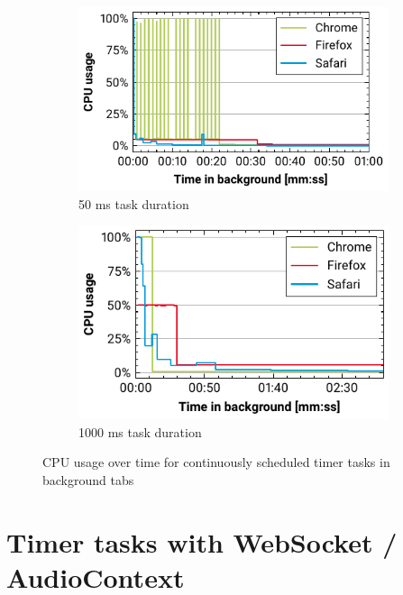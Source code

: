 \documentclass[
	ruledheaders=section,%
	class=report,%
	thesis={type=bachelor},%
	accentcolor=9c,%
	custommargins=true,%
	marginpar=false,%
	parskip=half-,%
	fontsize=11pt,%
]{tudapub}
\begin{document}
  \begin{figure}
    \begin{subfigure}[t]{0.5\textwidth}
      \includegraphics[width=\textwidth]{images/timer-50.pdf}
      \caption{50 ms task duration}
    \end{subfigure}
    \hfill
    \begin{subfigure}[t]{0.5\textwidth}
      \includegraphics[width=\textwidth]{images/timer-1000.pdf}
      \caption{1000 ms task duration}
    \end{subfigure}

    \caption{CPU usage over time for continuously scheduled timer tasks in background tabs}
    \label{fig:timer}
  \end{figure}

  \section{Timer tasks with WebSocket / AudioContext}
\end{document}
